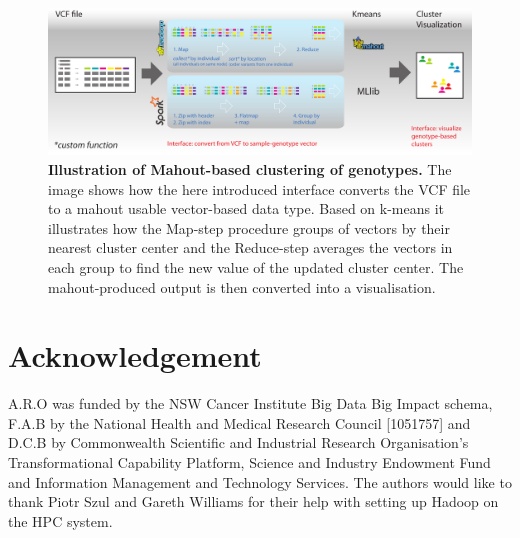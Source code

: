\documentclass{bioinfo}
\begin{document}
\begin{figure}[!tpb]%
\centerline{\includegraphics[type=pdf,ext=.pdf,read=.pdf, scale=0.40]{signature}}
        \label{fig:sign}
        \caption{{\bf Illustration of Mahout-based clustering of genotypes.}
      The image shows how the here introduced interface converts the VCF file to a mahout usable vector-based data type. Based on k-means it illustrates how the Map-step procedure groups of vectors by their nearest cluster center and the Reduce-step averages the vectors in each group to find the new value of the updated cluster center. The mahout-produced output is then converted into a visualisation.}

\end{figure}





\section*{Acknowledgement}
A.R.O was funded by the NSW Cancer Institute Big Data Big Impact schema, F.A.B by the National Health and Medical Research Council [1051757] and D.C.B by Commonwealth Scientific and Industrial Research Organisation's Transformational Capability Platform, Science and Industry Endowment Fund and Information Management and Technology Services.
The authors would like to thank Piotr Szul and Gareth Williams for their help with setting up Hadoop on the HPC system.  


%
%
%
%
  
\end{document}
